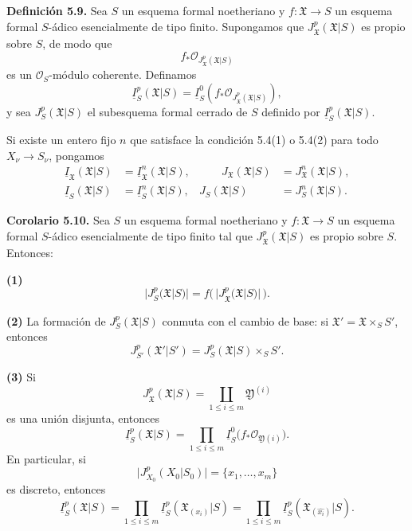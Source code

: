 \par\medskip
\noindent\textbf{Definición 5.9.}
Sea $S$ un esquema formal noetheriano y
$f:\mathfrak X\longrightarrow S$ un esquema formal $S$-ádico
esencialmente de tipo finito. Supongamos que
$J_{\mathfrak X}^p(\mathfrak X|S)$ es propio sobre $S$, de modo que
\[
f_*\mathcal O_{J_{\mathfrak X}^p(\mathfrak X|S)}
\]
es un $\mathcal O_S$-módulo coherente. Definamos
\[
\underline I_S^p(\mathfrak X|S)
=\underline I_S^0\!\left(
 f_*\mathcal O_{J_{\mathfrak X}^p(\mathfrak X|S)}
\right),
\]
y sea $J_S^p(\mathfrak X|S)$ el subesquema formal cerrado de $S$
definido por $\underline I_S^p(\mathfrak X|S)$.

Si existe un entero fijo $n$ que satisface la condición 5.4(1) o
5.4(2) para todo $X_\nu\longrightarrow S_\nu$, pongamos
\[
\begin{aligned}
\underline I_{\mathfrak X}(\mathfrak X|S)
 &=\underline I_{\mathfrak X}^n(\mathfrak X|S),
&\qquad
J_{\mathfrak X}(\mathfrak X|S)
 &=J_{\mathfrak X}^n(\mathfrak X|S),\\
\underline I_S(\mathfrak X|S)
 &=\underline I_S^n(\mathfrak X|S),
&
J_S(\mathfrak X|S)
 &=J_S^n(\mathfrak X|S).
\end{aligned}
\]

\medskip
\noindent\textbf{Corolario 5.10.}
Sea $S$ un esquema formal noetheriano y
$f:\mathfrak X\longrightarrow S$ un esquema formal $S$-ádico
esencialmente de tipo finito tal que
$J_{\mathfrak X}^p(\mathfrak X|S)$ es propio sobre $S$. Entonces:

\smallskip
\noindent\textbf{(1)}
\[
\bigl|J_S^p(\mathfrak X|S)\bigr|
=f\bigl(\,|J_{\mathfrak X}^p(\mathfrak X|S)|\,\bigr).
\]


\smallskip
\noindent\textbf{(2)} La formación de $J_S^p(\mathfrak X|S)$
conmuta con el cambio de base: si
$\mathfrak X'=\mathfrak X\times_SS'$, entonces
\[
J_{S'}^p(\mathfrak X'|S')
=J_S^p(\mathfrak X|S)\times_SS'.
\]

\smallskip
\noindent\textbf{(3)} Si
\[
J_{\mathfrak X}^p(\mathfrak X|S)
=\coprod_{1\leq i\leq m}\mathfrak Y^{(i)}
\]
es una unión disjunta, entonces
\[
\underline I_S^p(\mathfrak X|S)
=\prod_{1\leq i\leq m}
 \underline I_S^0\bigl(f_*\mathcal O_{\mathfrak Y(i)}\bigr).
\]
En particular, si
\[
\bigl|J_{X_0}^p(X_0|S_0)\bigr|=\{x_1,\ldots,x_m\}
\]
es discreto, entonces
\[
\underline I_S^p(\mathfrak X|S)
=\prod_{1\leq i\leq m}
 \underline I_S^p(\mathfrak X_{(x_i)}|S)
=\prod_{1\leq i\leq m}
 \underline I_S^p(\mathfrak X_{(\widehat{x_i})}|S).
\]

